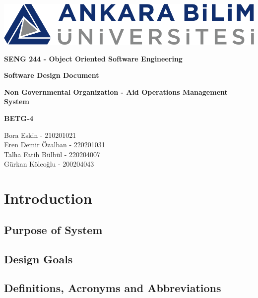 \documentclass[a4paper,12pt]{report}
\begin{document}
	\begin{titlepage}
		\begin{center}
			\includegraphics{ankara_bilim.png}
		\end{center}
		\vspace{1cm}
		\begin{center}
			\LARGE
			\textbf{SENG 244 - Object Oriented Software Engineering}
		\end{center}
		\vspace{1cm}
		\begin{center}
			\Large
			\textbf{Software Design Document}
		\end{center}
		\vspace{1cm}
		\begin{center}
			\Large
			\textbf{Non Governmental Organization - Aid Operations Management System}
		\end{center}
		\vspace{2cm}
		\begin{center}
			\large
			\textbf{BETG-4}
		\end{center}
		\vspace{1cm}
		\begin{center}
			\large
			Bora Eskin - 210201021\\
			Eren Demir Özalban - 220201031\\
			Talha Fatih Bülbül - 220204007\\
			Gürkan Köleoğlu - 200204043
		\end{center}
	\end{titlepage}
	
	\tableofcontents
	
	\chapter{Introduction}
		\section{Purpose of System}
		\section{Design Goals}
		\section{Definitions, Acronyms and Abbreviations}
\end{document}
